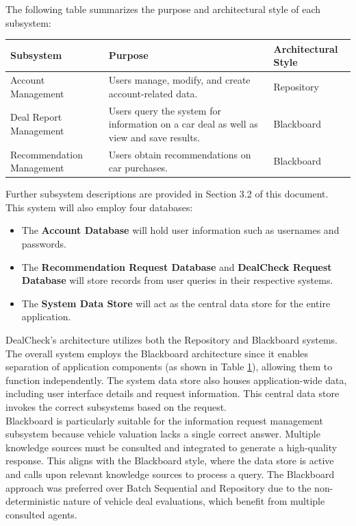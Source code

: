\documentclass[]{article}
\begin{document}
The following table summarizes the purpose and architectural style of each subsystem:
\FloatBarrier
\begin{table}[H]
    \centering
    \begin{tabular}{|p{4cm}|p{7cm}|p{3cm}|}
        \hline
        \textbf{Subsystem} & \textbf{Purpose} & \textbf{Architectural Style} \\
        \hline
        Account Management & Users manage, modify, and create account-related data. & Repository \\
        \hline
        Deal Report Management & Users query the system for information on a car deal as well as view and save results. & Blackboard \\
        \hline
        Recommendation Management & Users obtain recommendations on car purchases. & Blackboard \\
        \hline
    \end{tabular}
    \label{tab:dealcheck_subsystems}
\end{table}
\FloatBarrier
\noindent
Further subsystem descriptions are provided in Section 3.2 of this document. \\
\newline
This system will also employ four databases:
\begin{itemize}
    \item The \textbf{Account Database} will hold user information such as usernames and passwords.
    \item The \textbf{Recommendation Request Database} and \textbf{DealCheck Request Database} will store records from user queries in their respective systems.
    \item The \textbf{System Data Store} will act as the central data store for the entire application.
\end{itemize}

DealCheck's architecture utilizes both the Repository and Blackboard systems. The overall system employs the Blackboard architecture since it enables separation of application components (as shown in Table \ref{tab:dealcheck_subsystems}), allowing them to function independently. The system data store also houses application-wide data, including user interface details and request information. This central data store invokes the correct subsystems based on the request. \\

Blackboard is particularly suitable for the information request management subsystem because vehicle valuation lacks a single correct answer. Multiple knowledge sources must be consulted and integrated to generate a high-quality response. This aligns with the Blackboard style, where the data store is active and calls upon relevant knowledge sources to process a query. The Blackboard approach was preferred over Batch Sequential and Repository due to the non-deterministic nature of vehicle deal evaluations, which benefit from multiple consulted agents. \\
\end{document}
